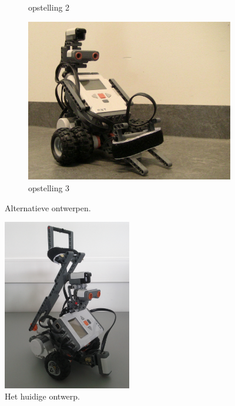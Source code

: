 \documentclass[tt3]{penoverslag}
\begin{document}
\begin{figure}
\begin{subfigure}[h]{0.325\textwidth}
		\caption{opstelling 2}
		\label{fig:robotOud2}
	\end{subfigure}
	\begin{subfigure}[h]{0.325\textwidth}
		\centering
		\includegraphics[width=\textwidth]{robotOud3}
		\caption{opstelling 3}
		\label{fig:robotOud3}
	\end{subfigure}
\caption{Alternatieve ontwerpen.}
\label{fig:robotOud}
\end{figure}

\begin{figure}
\centering
	\includegraphics[width=0.5\textwidth]{robotNieuw}
\caption{Het huidige ontwerp.}
\label{fig:robotBouw}
\end{figure}
\end{document}
